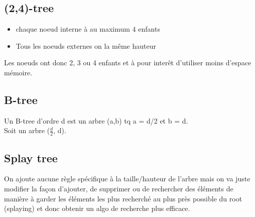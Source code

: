 \documentclass[a4paper]{article}
\begin{document}
\subsection{(2,4)-tree}
\begin{itemize}
\item chaque noeud interne à au maximum 4 enfants
\item Tous les noeuds externes on la même hauteur
\end{itemize}

Les noeuds ont donc 2, 3 ou 4 enfants et à pour interêt d'utiliser moins d'espace mémoire.

\subsection{B-tree}
Un B-tree d'ordre d est un arbre (a,b) tq a = d/2 et b = d.\\
Soit un arbre ($\frac{d}{2}$, d).

\subsection{Splay tree}
On ajoute aucune règle spécifique à la taille/hauteur de l'arbre mais on va juste modifier la façon d'ajouter, de supprimer ou de rechercher des éléments de manière à garder les éléments les plus recherché au plus près possible du root (splaying) et donc obtenir un algo de recherche plus efficace.
\end{document}
